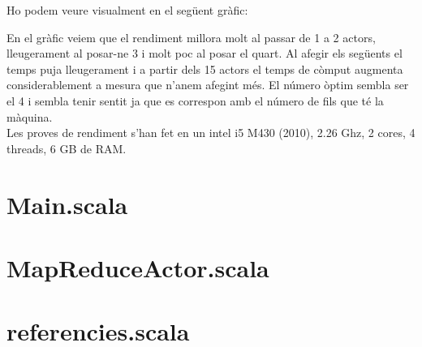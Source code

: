 \documentclass{report}
\begin{document}
Ho podem veure visualment en el següent gràfic:

\begin{center}
\end{center}

En el gràfic veiem que el rendiment millora molt al passar de 1 a 2 actors, lleugerament al posar-ne 3 i molt poc al posar el quart.
Al afegir els següents el temps puja lleugerament i a partir dels 15 actors el temps de còmput augmenta considerablement a mesura que n'anem afegint més. El número òptim sembla ser el 4 i sembla tenir sentit ja que es correspon amb el número de fils que té la màquina. \\

Les proves de rendiment s'han fet en un intel i5 M430 (2010), 2.26 Ghz, 2 cores, 4 threads, 6 GB de RAM.

\begin{appendices}

\section{Main.scala}


\newpage
\section{MapReduceActor.scala}


\section{referencies.scala}


\end{appendices}
\end{document}
